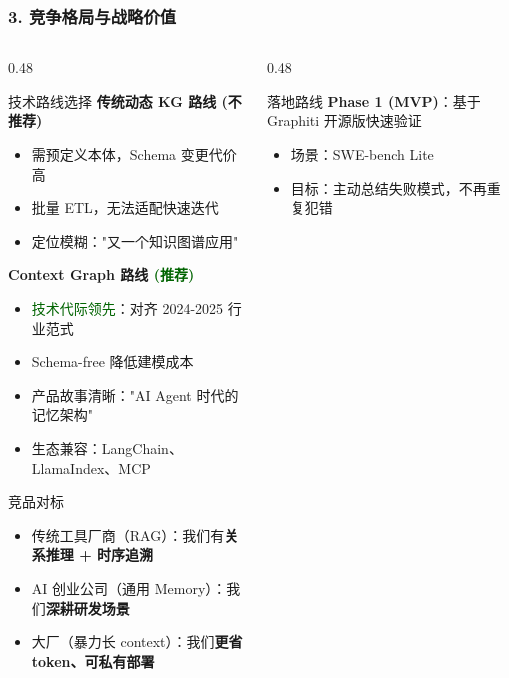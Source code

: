 \documentclass[aspectratio=169,10pt]{beamer}
\begin{document}
\begin{frame}
  \frametitle{3. 竞争格局与战略价值}

  \begin{columns}[T]
    \begin{column}{0.48\textwidth}
      \begin{block}{技术路线选择}
        \scriptsize
        \textbf{传统动态 KG 路线 \textcolor{dotred}{(不推荐)}}
        \begin{itemize}
            \item 需预定义本体，Schema 变更代价高
            \item 批量 ETL，无法适配快速迭代
            \item 定位模糊："又一个知识图谱应用"
        \end{itemize}

        \vspace{0.05cm}
        \textbf{Context Graph 路线 \textcolor{darkgreen}{(推荐)}}
        \begin{itemize}
            \item \textcolor{darkgreen}{技术代际领先}：对齐 2024-2025 行业范式
            \item Schema-free 降低建模成本
            \item 产品故事清晰："AI Agent 时代的记忆架构"
            \item 生态兼容：LangChain、LlamaIndex、MCP
        \end{itemize}
      \end{block}

      \vspace{0.05cm}

      \begin{alertblock}{竞品对标}
        \scriptsize
        \begin{itemize}
            \item 传统工具厂商（RAG）：我们有\textbf{关系推理 + 时序追溯}
            \item AI 创业公司（通用 Memory）：我们\textbf{深耕研发场景}
            \item 大厂（暴力长 context）：我们\textbf{更省 token、可私有部署}
        \end{itemize}
      \end{alertblock}
    \end{column}

    \begin{column}{0.48\textwidth}
      \begin{block}{落地路线}
        \scriptsize
        \textbf{Phase 1 (MVP)}：基于 Graphiti 开源版快速验证
        \begin{itemize}
            \item 场景：SWE-bench Lite
            \item 目标：主动总结失败模式，不再重复犯错
        \end{itemize}


\end{block}
\end{column}
\end{columns}
\end{frame}
\end{document}
